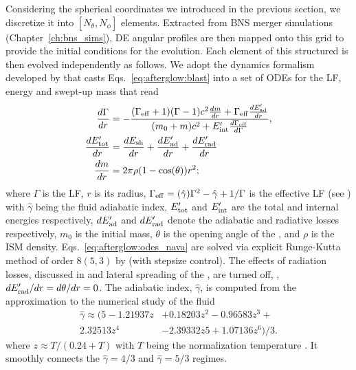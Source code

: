 Considering the spherical coordinates we introduced in the previous section, 
we discretize it into $[N_{\theta},N_{\phi}]$ elements.
%
Extracted from \ac{BNS} merger simulations (Chapter~\ref{ch:bns_sims}), 
\ac{DE} angular profiles are then mapped onto this grid to provide the 
initial conditions for the evolution. 
%
Each element of this structured \blast{} is then evolved independently 
as follows. 
%
We adopt the \blast{} dynamics formalism developed by \citet{Nava:2013} that casts 
Eqs.~\eqref{eq:afterglow:blast} into a set of \acp{ODE} for the \blast{} \ac{LF}, 
energy and swept-up mass that read 
%
\begin{subequations}
    \label{eq:afterglow:odes_nava}
    \begin{align}
    \frac{d\Gamma}{dr} &= -\frac{(\Gamma_{\rm eff} + 1)(\Gamma - 1) c^2\frac{dm}{dr} + \Gamma_{\rm eff}\frac{dE'_{\rm ad}}{dr}}{(m_0 + m) c^2 + E'_{\rm int}\frac{d\Gamma_{\rm eff}\rm }{d\Gamma}}, \\
    \frac{dE'_{\rm tot}}{dr} &= \frac{dE_{\rm sh}}{dr} + \frac{dE'_{\rm ad}}{dr} + \frac{dE'_{\rm rad}}{dr} \\
    \frac{dm}{dr} &= 2 \pi \rho (1 - \cos(\theta)) r^2;
    \end{align}
\end{subequations}
%
where $\Gamma$ is the \blast{} \ac{LF}, $r$ is its radius, 
$\Gamma_{\rm eff} = (\hat{\gamma})\Gamma^2-\hat{\gamma}+1 / \Gamma$ is the effective 
\ac{LF} (see \citet{Nava:2013}) 
with $\hat{\gamma}$ being the fluid adiabatic index, 
$E'_{\rm tot}$ and  $E'_{\rm int}$ are the total and internal energies respectively, 
$dE'_{\rm ad}$ and $dE'_{\rm rad}$ denote the adiabatic and radiative losses respectively, 
$m_0$ is the initial mass, 
$\theta$ is the opening angle of the \blast{}, 
and $\rho$ is the \ac{ISM} density.
%
Eqs.~\ref{eq:afterglow:odes_nava} are solved via 
explicit Runge-Kutta method of order $8(5,3)$ by \citet{Dormand:1980} 
(with stepsize control). 
%
The effects of radiation losses, discussed in \citet{Nava:2013} and lateral 
spreading of the \blast{} \citep[\eg][]{Granot:2012}, are turned off,
\ie, $d E'_{\rm rad}/dr = d\theta / dr = 0$.
%
The adiabatic index, $\hat{\gamma}$, is computed from the approximation to the 
numerical study of the \trans{} fluid \citep{Service:1986}
%
\begin{eqnarray}
\hat{\gamma} \approx (5 - 1.21937z &+ 0.18203z^2 - 0.96583z^3 + \\
2.32513z^4 &- 2.39332z 5 + 1.07136z^6)/3.
\end{eqnarray}
% 
where $z \approx T/(0.24 + T)$ with $T$ being the normalization temperature
\citep{Peer:2012}.
%
It smoothly connects the 
$\hat{\gamma}=4/3$ and $\hat{\gamma}=5/3$ regimes. 



